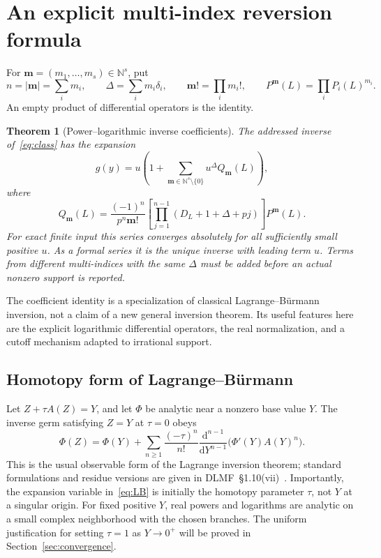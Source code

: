 \documentclass[11pt,a4paper]{article}
\numberwithin{equation}{section}
\newtheorem{theorem}{Theorem}[section]
\theoremstyle{definition}
\theoremstyle{remark}
\newcommand{\N}{\mathbb N}
\newcommand{\dd}{\mathrm d}
\begin{document}
\section{An explicit multi-index reversion formula}
\label{sec:formula}

For $\boldsymbol m=(m_1,\ldots,m_s)\in\N^s$, put
\[
 n=|\boldsymbol m|=\sum_i m_i,\qquad
 \Delta=\sum_i m_i\delta_i,\qquad
 \boldsymbol m!=\prod_i m_i!,\qquad
 P^{\boldsymbol m}(L)=\prod_i P_i(L)^{m_i}.
\]
An empty product of differential operators is the identity.

\begin{theorem}[Power--logarithmic inverse coefficients]\label{thm:main}
The addressed inverse of~\eqref{eq:class} has the expansion
\begin{equation}\label{eq:mainseries}
 g(y)=u\left(1+\sum_{\boldsymbol m\in\N^s\setminus\{0\}}
 u^\Delta Q_{\boldsymbol m}(L)\right),
\end{equation}
where
\begin{equation}\label{eq:Qformula}
 \boxed{\displaystyle
 Q_{\boldsymbol m}(L)=
 \frac{(-1)^n}{p^n\boldsymbol m!}
 \left[\prod_{j=1}^{n-1}(D_L+1+\Delta+pj)\right]
 P^{\boldsymbol m}(L).}
\end{equation}
For exact finite input this series converges absolutely for all sufficiently
small positive $u$. As a formal series it is the unique inverse with
leading term $u$. Terms from different multi-indices with the same $\Delta$
must be added before an actual nonzero support is reported.
\end{theorem}

The coefficient identity is a specialization of classical
Lagrange--B\"urmann inversion, not a claim of a new general inversion
theorem. Its useful features here are the explicit logarithmic differential
operators, the real normalization, and a cutoff mechanism adapted to
irrational support.

\subsection{Homotopy form of Lagrange--B\"urmann}

Let $Z+\tau A(Z)=Y$, and let $\Phi$ be analytic near a nonzero base value
$Y$. The inverse germ satisfying $Z=Y$ at $\tau=0$ obeys
\begin{equation}\label{eq:LB}
 \Phi(Z)=\Phi(Y)+\sum_{n\ge1}\frac{(-\tau)^n}{n!}
 \frac{\dd^{n-1}}{\dd Y^{n-1}}
 \bigl(\Phi'(Y)A(Y)^n\bigr).
\end{equation}
This is the usual observable form of the Lagrange inversion theorem;
standard formulations and residue versions are given in
DLMF~\S1.10(vii)~\cite{dlmfinverse}. Importantly, the expansion variable
in~\eqref{eq:LB} is initially the homotopy parameter $\tau$, not $Y$ at a
singular origin. For fixed positive $Y$, real powers and logarithms are
analytic on a small complex neighborhood with the chosen branches.
The uniform justification for setting $\tau=1$ as $Y\to0^+$ will be proved
in Section~\ref{sec:convergence}.
\end{document}
